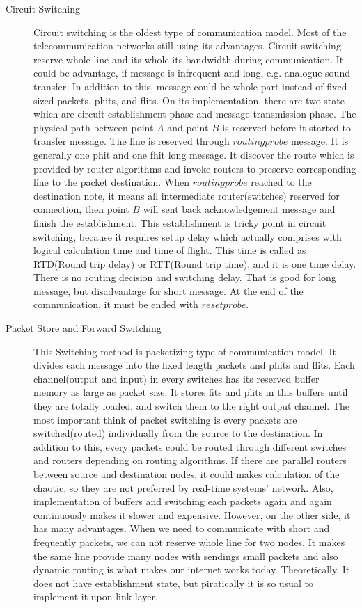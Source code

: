 \begin{description}
\item[Circuit Switching] Circuit switching is the oldest type of communication model. Most of the telecommunication networks still using its advantages. Circuit switching reserve whole line and its whole its bandwidth during communication. It could be advantage, if message is infrequent and long, e.g. analogue sound transfer. In addition to this, message could be whole part instead of fixed sized packets, phits, and flits. On its implementation, there are two state which are circuit establishment phase and message transmission phase\cite{0122007514}. The physical path between point $A$ and point $B$ is reserved before it started to transfer message. The line is reserved through $routing probe$ message. It is generally one phit and one fhit long message. It discover the route which is provided by router algorithms and invoke routers to preserve corresponding line to the packet destination. When $routing probe$ reached to the destination note, it means all intermediate router(switches) reserved for connection, then point $B$ will sent back acknowledgement message and finish the establishment. This establishment is tricky point in circuit switching, because it requires setup delay which actually comprises with logical calculation time and time of flight. This time is called as RTD(Round trip delay) or RTT(Round trip time), and it is one time delay. There is no routing decision and switching delay. That is good for long message, but disadvantage for short message. At the end of the communication, it must be ended with $reset probe$.
\item[Packet Store and Forward Switching] This Switching method is packetizing type of communication model. It divides each message into the fixed length packets and phits and flits. Each channel(output and input) in every switches has its reserved buffer memory as large as packet size. It stores fits and plits in this buffers until they are totally loaded, and switch them to the right output channel. The most important think of packet switching is every packets are switched(routed) individually from the source to the destination. In addition to this, every packets could be routed through different switches and routers depending on routing algorithms. If there are parallel routers between source and destination nodes, it could makes calculation of the chaotic, so they are not preferred by real-time systems' network. Also, implementation of buffers and switching each packets again and again continuously makes it slower and expensive. However, on the other side, it has many advantages. When we need to communicate with short and frequently packets, we can not reserve whole line for two nodes. It makes the same line provide many nodes with sendings small packets and also dynamic routing is what makes our internet works today. Theoretically, It does not have establishment state, but piratically it is so usual to implement it upon link layer.

\end{description}
